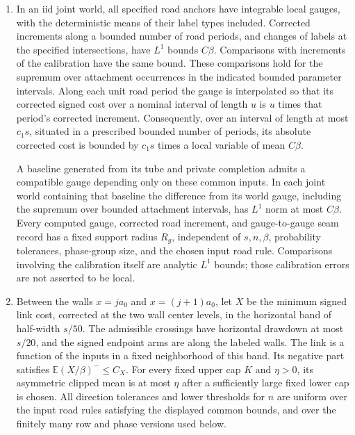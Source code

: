 \begin{enumerate}
\item[(G)] In an iid joint world, all specified road anchors have
integrable local gauges, with the deterministic means of their label
types included. Corrected increments along a bounded number of road
periods, and changes of labels at the specified intersections, have
$L^1$ bounds $C\beta$. Comparisons with increments of the calibration
have the same bound. These comparisons hold for the supremum over
attachment occurrences in the indicated bounded parameter intervals.
Along each unit road period the gauge is interpolated so that its
corrected signed cost over a nominal interval of length $u$ is $u$
times that period's corrected increment. Consequently, over an
interval of length at most $c_1s$, situated in a prescribed bounded
number of periods, its absolute corrected cost is bounded by
$c_1s$ times a local variable of mean $C\beta$.

A baseline generated from its tube and private completion admits a
compatible gauge depending only on these common inputs. In each joint
world containing that baseline the difference from its world gauge,
including the supremum over bounded attachment intervals, has
$L^1$ norm at most $C\beta$. Every computed gauge, corrected road increment, and gauge-to-gauge
seam record has a fixed support radius $R_g$, independent of
$s,n,\beta$, probability tolerances, phase-group size, and the chosen
input road rule. Comparisons involving the calibration itself are
analytic $L^1$ bounds; those calibration errors are not asserted to
be local.

\item[(L)] Between the walls $x=ja_0$ and $x=(j+1)a_0$, let $X$ be
the minimum signed link cost, corrected at the two wall center levels,
in the horizontal band of half-width $s/50$. The admissible crossings
have horizontal drawdown at most $s/20$, and the signed endpoint arms
are along the labeled walls. The link is a function of the inputs in
a fixed neighborhood of this band. Its negative part satisfies
$\mathbb E(X/\beta)^-\leq C_X$. For every fixed upper cap $K$ and
$\eta>0$, its asymmetric clipped mean is at most $\eta$ after a
sufficiently large fixed lower cap is chosen. All direction tolerances and lower thresholds for $n$ are uniform
over the input road rules satisfying the displayed common bounds,
and over the finitely many row and phase versions used below.


\end{enumerate}
